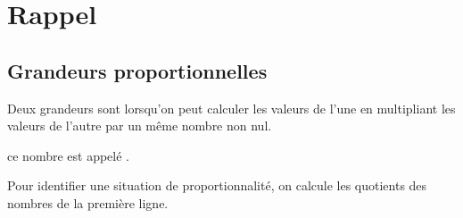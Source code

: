\documentclass[12pt,a4paper]{article}
\date{}
\title{}
\begin{document}








\section{Rappel}

\subsection{Grandeurs proportionnelles}

\begin{mydef}
	Deux grandeurs sont  lorsqu'on peut calculer les valeurs de l'une en multipliant les valeurs de l'autre par un même nombre non nul.
	
	ce nombre est appelé .
\end{mydef}


\begin{mymeth}
	Pour identifier une situation de proportionnalité, on calcule les quotients des nombres de la première ligne.
\end{mymeth}
\end{document}

